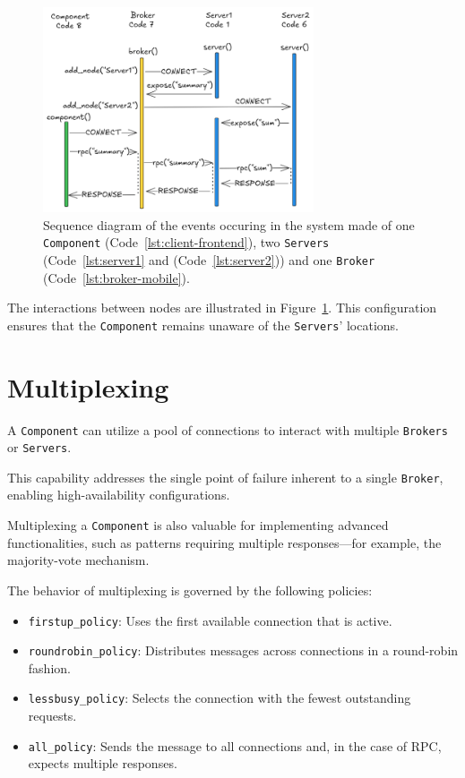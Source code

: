 \documentclass{juliacon}
\begin{document}
\begin{figure}[t]
  \centerline{\includegraphics[width=8cm]{figures/server-broker-example.png}}
  \caption{Sequence diagram of the events occuring in the system made of 
          one \texttt{Component} (Code~\ref{lst:client-frontend}), two
          \texttt{Servers} (Code~\ref{lst:server1} and (Code~\ref{lst:server2}))
          and one \texttt{Broker} (Code~\ref{lst:broker-mobile}).}
      \label{fig:server-broker-example}
  \end{figure}

The interactions between nodes are illustrated in Figure~\ref{fig:server-broker-example}.
This configuration ensures that the \texttt{Component} remains unaware of the
\texttt{Servers}' locations.

\section{Multiplexing}\label{multiplexing}

A \texttt{Component} can utilize a pool of connections to interact with multiple
\texttt{Brokers} or \texttt{Servers}.

This capability addresses the single point of failure inherent to a single \texttt{Broker},
enabling high-availability configurations.
\vskip 6pt

Multiplexing a \texttt{Component} is also valuable for implementing advanced functionalities,
such as patterns requiring multiple responses—for example, the majority-vote mechanism.
\vskip 6pt

The behavior of multiplexing is governed by the following policies:

\begin{itemize}
  \item \texttt{firstup\_policy}: Uses the first available connection that is active.
  \item \texttt{roundrobin\_policy}: Distributes messages across connections in a round-robin fashion.
  \item \texttt{lessbusy\_policy}: Selects the connection with the fewest outstanding requests.
  \item \texttt{all\_policy}: Sends the message to all connections and, in the case of RPC, expects multiple responses.
\end{itemize}
\end{document}
